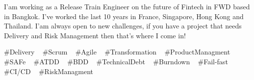 

\begin{cvparagraph}


I'am working as a Release Train Engineer on the future of Fintech in FWD based in Bangkok.
I’ve worked the last 10 years in France, Singapore, Hong Kong and Thailand.
I'am always open to new challenges, if you have a project that needs Delivery and Risk Management then that’s where I come in!


\end{cvparagraph}
\begin{cvtechnologies}
 \#Delivery  ~
 \#Scrum ~
 \#Agile ~
 \#Transformation ~
 \#ProductManagment ~
 \#SAFe ~
 \#ATDD ~
 \#BDD ~
 \#TechnicalDebt ~
 \#Burndown ~
 \#Fail-fast ~
 \#CI/CD ~
 \#RiskManagment ~
\end{cvtechnologies}
